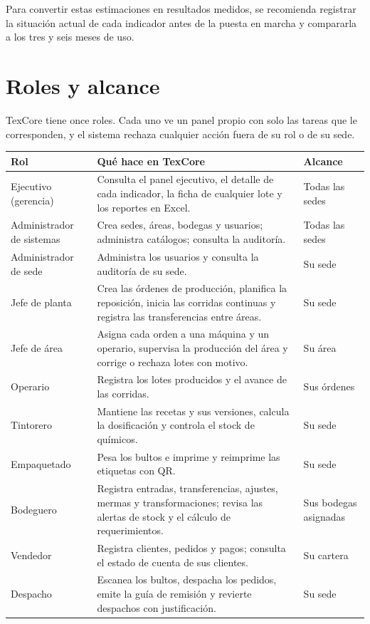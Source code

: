 \documentclass[11pt,a4paper]{article}
\newcommand{\encabezado}{\rowcolor{fondo}}
\begin{document}
Para convertir estas estimaciones en resultados medidos, se recomienda registrar la situación actual de cada indicador antes de la puesta en marcha y compararla a los tres y seis meses de uso.

\section{Roles y alcance}

TexCore tiene once roles. Cada uno ve un panel propio con solo las tareas que le corresponden, y el sistema rechaza cualquier acción fuera de su rol o de su sede.

\begin{center}
\begin{tabularx}{\textwidth}{P{3.5cm}LP{2.8cm}}
\toprule
\encabezado \textbf{Rol} & \textbf{Qué hace en TexCore} & \textbf{Alcance} \\
\midrule
Ejecutivo (gerencia) & Consulta el panel ejecutivo, el detalle de cada indicador, la ficha de cualquier lote y los reportes en Excel. & Todas las sedes \\
Administrador de sistemas & Crea sedes, áreas, bodegas y usuarios; administra catálogos; consulta la auditoría. & Todas las sedes \\
Administrador de sede & Administra los usuarios y consulta la auditoría de su sede. & Su sede \\
Jefe de planta & Crea las órdenes de producción, planifica la reposición, inicia las corridas continuas y registra las transferencias entre áreas. & Su sede \\
Jefe de área & Asigna cada orden a una máquina y un operario, supervisa la producción del área y corrige o rechaza lotes con motivo. & Su área \\
Operario & Registra los lotes producidos y el avance de las corridas. & Sus órdenes \\
Tintorero & Mantiene las recetas y sus versiones, calcula la dosificación y controla el stock de químicos. & Su sede \\
Empaquetado & Pesa los bultos e imprime y reimprime las etiquetas con QR. & Su sede \\
Bodeguero & Registra entradas, transferencias, ajustes, mermas y transformaciones; revisa las alertas de stock y el cálculo de requerimientos. & Sus bodegas asignadas \\
Vendedor & Registra clientes, pedidos y pagos; consulta el estado de cuenta de sus clientes. & Su cartera \\
Despacho & Escanea los bultos, despacha los pedidos, emite la guía de remisión y revierte despachos con justificación. & Su sede \\
\bottomrule
\end{tabularx}
\end{center}
\end{document}
